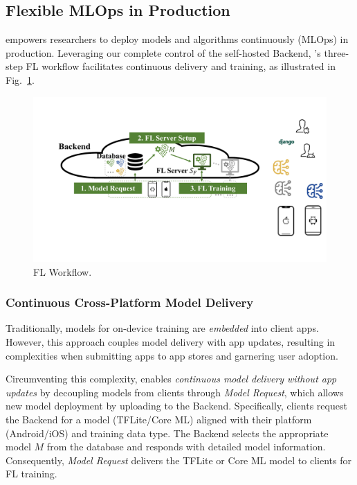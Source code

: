\documentclass[conference]{IEEEtran}
\begin{document}
\subsection{Flexible MLOps in Production}
\label{sec:mlops}
\newcommand{\model}{$M$}
\newcommand{\fs}{$S_\mathrm F$}
\FedKit{} empowers researchers to deploy models and algorithms continuously (MLOps)
in production.
Leveraging our complete control of the self-hosted Backend,
\FedKit{}'s three-step FL workflow
facilitates continuous delivery and training,
as illustrated in Fig.~\ref{fig:fl-workflow}.

\begin{figure}
    \centering
    \includegraphics*[width=0.9\linewidth]{fl_workflow.pdf}
    \caption{\FedKit{} FL Workflow.}
    \label{fig:fl-workflow}
\end{figure}

\subsubsection{Continuous Cross-Platform Model Delivery}
Traditionally, models for on-device training are \textit{embedded} into client apps.
However, this approach couples model delivery with app updates,
resulting in complexities when submitting apps to app stores and garnering user adoption.

Circumventing this complexity,
\FedKit{} enables \textit{continuous model delivery without app updates} by
decoupling models from clients through \textit{Model Request},
which allows new model deployment by uploading to the Backend.
Specifically, clients request the Backend for a model (TFLite/Core ML)
aligned with
their platform (Android/iOS) and training data type.
The Backend selects the appropriate model \model{} from the database and
responds with detailed model information.
Consequently, \textit{Model Request} delivers the TFLite or Core ML model
to clients for FL training.
\end{document}
